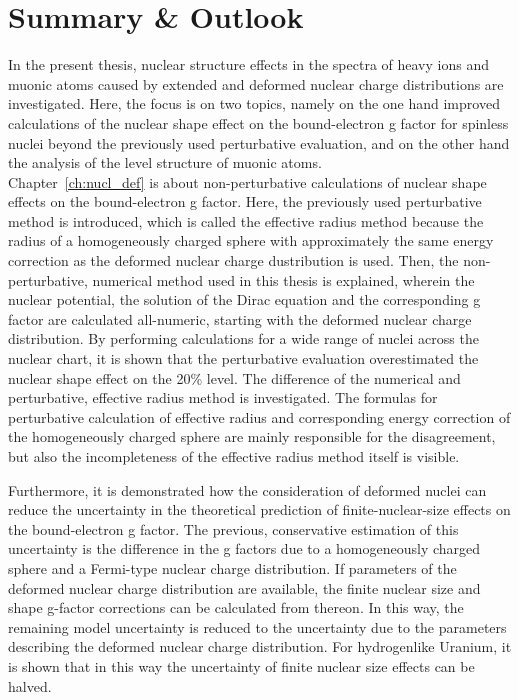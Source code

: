 \chapter*{Summary \& Outlook}
\label{ch:conclusion}


In the present thesis, nuclear structure effects in the spectra of heavy ions and muonic atoms caused by extended and deformed nuclear charge distributions are investigated. 
Here, the focus is on two topics, namely on the one hand improved calculations of the nuclear shape effect on the bound-electron g factor for spinless nuclei beyond the previously used perturbative evaluation, and on the other hand the analysis of the level structure of muonic atoms.\\

Chapter~\ref{ch:nucl_def} is about non-perturbative calculations of nuclear shape effects on the bound-electron g factor. Here, the previously used perturbative method is introduced, which is called the effective radius method because the radius of a homogeneously charged sphere with approximately the same energy correction as the deformed nuclear charge dustribution is used. 
Then, the non-perturbative, numerical method used in this thesis is explained, wherein the nuclear potential, the solution of the Dirac equation and the corresponding g factor are calculated all-numeric, starting with the deformed nuclear charge distribution. By performing calculations for a wide range of nuclei across the nuclear chart, it is shown that the perturbative evaluation overestimated the nuclear shape effect on the 20\% level. The difference of the numerical and perturbative, effective radius method is investigated. The formulas for perturbative calculation of effective radius and corresponding energy correction of the homogeneously charged sphere are mainly responsible for the disagreement, but also the incompleteness of the effective radius method itself is visible.

Furthermore, it is demonstrated how the consideration of deformed nuclei can reduce the uncertainty in the theoretical prediction of finite-nuclear-size effects on the bound-electron g factor. The previous, conservative estimation of this uncertainty is the difference in the g factors due to a homogeneously charged sphere and a Fermi-type nuclear charge distribution. If parameters of the deformed nuclear charge distribution are available, the finite nuclear size and shape g-factor corrections can be calculated from thereon. In this way, the remaining model uncertainty is reduced to the uncertainty due to the parameters describing the deformed nuclear charge distribution. For hydrogenlike Uranium, it is shown that in this way the uncertainty of finite nuclear size effects can be halved.\\ 

